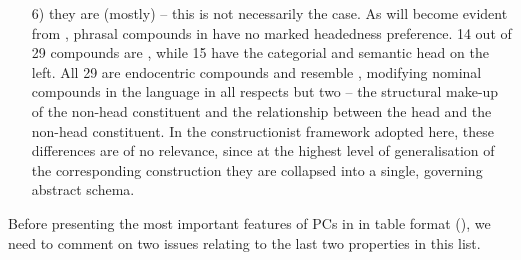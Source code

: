 \documentclass[output=paper]{LSP/langsci}
\begin{document}
\begin{itemize}
\item[6)] they are (mostly)  – this is not necessarily the case. As will become evident from , phrasal compounds in  have no marked headedness preference. 14 out of 29 compounds are , while 15 have the categorial and semantic head on the left. All 29 are endocentric compounds and resemble , modifying nominal compounds in the language in all respects but two – the structural make-up of the non-head constituent and the relationship between the head and the non-head constituent. In the constructionist framework adopted here, these differences are of no relevance, since at the highest level of generalisation of the corresponding construction they are collapsed into a single, governing abstract schema.

\end{itemize}

Before presenting the most important features of PCs in  in table format (), we need to comment on two issues relating to the last two properties in this list.
\end{document}
